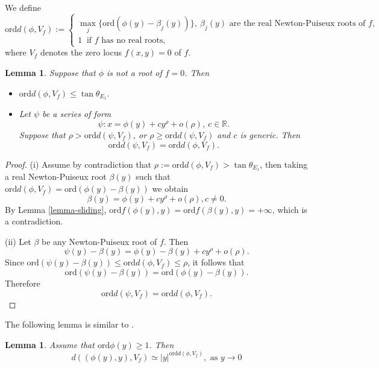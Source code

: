\documentclass[reqno, 12pt ,a4letter]{amsart}
\newtheorem {lemma}[theorem]{Lemma}
\theoremstyle{definition}
\begin{document}
We define
$$
\mathrm{ord}d(\phi, V_f) := \begin{cases}\label{order-distance}
	\max\limits_{j} \{\mathrm{ord}(\phi(y)-\beta_j(y))\},\ \text{$\beta_j(y)$ are the real Newton-Puiseux roots of $f$,}\\
	1\ \text{ if $f$ has no real roots,}
\end{cases} 	
$$
where $V_f$ denotes the zero locus $f(x,y)=0$ of $f$.
\begin{lemma}\label{distant-sliding}
Suppose that $\phi$ is not a root of $f = 0$. Then
	\begin{itemize}
		\item[(i)] $\mathrm{ord}d(\phi, V_f)\leq \tan \theta_{E_1}.$		
		\item[(ii)] Let $\psi$ be a series of form
	$$\psi : x = \phi(y) + c y^{\rho} + o(\rho),\ c \in \mathbb{R}.$$
Suppose that $\rho>\mathrm{ord}d(\psi, V_f)$, or $\rho\geq \mathrm{ord}d(\psi, V_f)$ and $c$ is generic. Then
		$$\mathrm{ord}d(\psi, V_f)= \mathrm{ord}d(\phi, V_f).$$
	\end{itemize}
\end{lemma}
\begin{proof}
(i) Assume by contradiction that $\rho:=\mathrm{ord}d(\phi, V_f)> \tan \theta_{E_1}$, then taking a real Newton-Puiseux root $\beta(y)$ such that $\mathrm{ord}d(\phi, V_f)=\mathrm{ord}(\phi(y)-\beta(y))$ we obtain
$$\beta(y)= \phi(y) + c y^{\rho} + o(\rho), c\neq 0.$$
By Lemma \ref{lemma-sliding}, $\mathrm{ord} f(\phi(y), y) = \mathrm{ord} f(\beta(y), y)=+\infty$, which is a contradiction.

(ii) Let $\beta$ be any Newton-Puiseux root of $f$. Then
$$\psi(y)-\beta(y)=\phi(y)-\beta(y)+ c y^{\rho} + o(\rho).$$
Since $\mathrm{ord}\left(\psi(y)-\beta(y)\right)\leq \mathrm{ord}d(\phi, V_f)\leq \rho$, it follows that
$$\mathrm{ord}\left(\psi(y)-\beta(y)\right)=\mathrm{ord}\left(\phi(y)-\beta(y)\right).$$
Therefore
$$\mathrm{ord}d(\psi, V_f)=\mathrm{ord}d(\phi, V_f).$$
\end{proof}
The following lemma is similar to \cite[Proposition 2.3]{HD10}.
\begin{lemma}\label{distance}
	Assume that $\mathrm{ord}\phi(y) \ge 1$. Then
	$$ d( (\phi(y),y), V_f ) \simeq |y|^{\mathrm{ord}d(\phi, V_f)}, \text{ as } y\to 0$$

\end{lemma}
\end{document}
